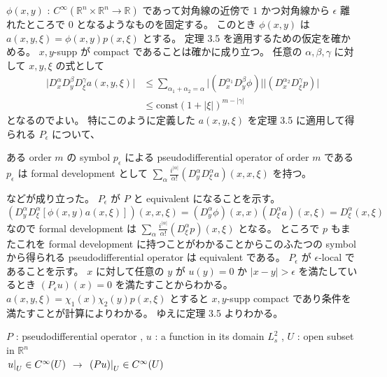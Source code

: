 \begin{Proof}
\itemprof
  \(\phi(x,y)\) : \(C^\infty(\mathbb{R}^n \times \mathbb{R}^n \to \mathbb{R})\) であって対角線の近傍で \(1\) かつ対角線から \(\epsilon\) 離れたところで \(0\) となるようなものを固定する。
  このとき \(\phi(x,y)\) は
  \(a(x,y,\xi) = \phi(x,y)p(x,\xi)\) とする。
  定理 3.5 を適用するための仮定を確かめる。
  \(x,y\)-supp が compact であることは確かに成り立つ。
  任意の \(\alpha , \beta , \gamma\) に対して \(x,y,\xi\) の式として 
  \begin{align*}
    \lvert D^\alpha_x D^\beta_y D^\gamma_\xi a(x,y,\xi) \rvert
    &\leq \sum_{\alpha_1 + \alpha_2 
    = \alpha} \lvert (D^{\alpha_1}_x D^\beta_y \phi) \rvert \lvert (D^{\alpha_2}_x D^\gamma_\xi p) \rvert \\
    &\leq \text{const} (1 + \lvert \xi \rvert)^{m - \lvert \gamma \rvert}
  \end{align*}
  となるのでよい。
  特にこのように定義した \(a(x,y,\xi)\) を定理 3.5 に適用して得られる \(P_{\epsilon}\) について、
  \begin{itemize}
    \itemenum ある order \(m\) の symbol \(p_{\epsilon}\) による pseudodifferential operator of order \(m\) である
    \itemenum \(p_{\epsilon}\) は formal development として \(\sum_{\alpha} \frac{i^{\lvert \alpha \rvert}}{\alpha !} (D^\alpha_y D^\alpha_\xi a)(x , x , \xi)\) を持つ。
  \end{itemize}
  などが成り立った。
\itemthen
  \(P_{\epsilon}\) が \(P\) と equivalent になることを示す。
  \[
    (D^\alpha_y D^\alpha_\xi [\phi(x,y) a(x,\xi)])(x,x,\xi) = (D^\alpha_y \phi)(x,x) (D^\alpha_\xi a)(x,\xi) = D^\alpha_\xi(x,\xi)
  \]
  なので formal development は \(\sum_{\alpha} \frac{i^{\lvert \alpha \rvert}}{\alpha !} (D^\alpha_\xi p)(x,\xi)\) となる。
  ところで \(p\) もまたこれを formal development に持つことがわかることからこのふたつの symbol から得られる pseudodifferential operator は equivalent である。
\itemthen
  \(P_{\epsilon}\) が \(\epsilon\)-local であることを示す。
  \(x\) に対して任意の \(y\) が \(u (y) = 0\) か \(\lvert x - y \rvert > \epsilon\) を満たしているとき \((P_{\epsilon} u)(x) = 0\) を満たすことからわかる。
\itemprof
  \(a(x,y,\xi) = \chi_1(x)\chi_2(y)p(x,\xi)\) とすると \(x,y\)-supp compact であり条件を満たすことが計算によりわかる。
  ゆえに定理 3.5 よりわかる。
\end{Proof}

\begin{Theorem}
\itemprop
  \For \(P\) : pseudodifferential operator , \(u\) : a function in its domain \(L^2_s\) , \(U\) : open subset in \(\mathbb{R}^n\) \\
  \Then \(\left. {u} \right| _{U} \in C^\infty(U)\) \(\rightarrow\) \(\left. {(P u)} \right| _{U} \in C^\infty(U)\)
\end{Theorem}

